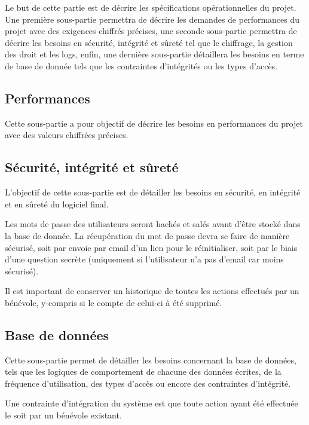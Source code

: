 Le but de cette partie est de décrire les spécifications opérationnelles du projet. Une première sous-partie permettra de décrire les demandes de performances du projet avec des exigences chiffrés précises, une seconde sous-partie permettra de décrire les besoins en sécurité, intégrité et sûreté tel que le chiffrage, la gestion des droit et les logs, enfin, une dernière sous-partie détaillera les besoins en terme de base de donnée tels que les contraintes d'intégrités ou les types d'accès.

\subsection{Performances}

Cette sous-partie a pour objectif de décrire les besoins en performances du projet avec des valeurs chiffrées précises.




\subsection{Sécurité, intégrité et sûreté}

L'objectif de cette sous-partie est de détailler les besoins en sécurité, en intégrité et en sûreté du logiciel final.

Les mots de passe des utilisateurs seront hachés et salés avant d'être stocké dans la base de donnée. La récupération du mot de passe devra se faire de manière sécurisé, soit par envoie par email d'un lien pour le réinitialiser, soit par le biais d'une question secrète (uniquement si l'utilisateur n'a pas d'email car moins sécurisé). 

Il est important de conserver un historique de toutes les actions effectués par un bénévole, y-compris si le compte de celui-ci à été supprimé. 


\subsection{Base de données}

Cette sous-partie permet de détailler les besoins concernant la base de données, tels que les logiques de comportement de chacune des données écrites, de la fréquence d'utilisation, des types d'accès ou encore des contraintes d'intégrité.

Une contrainte d'intégration du système est que toute action ayant été effectuée le soit par un bénévole existant.
